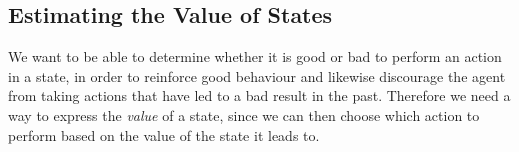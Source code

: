 \documentclass[11pt]{article}
\begin{document}
\maketitle


\subsection{Estimating the Value of States}\label{est_vals}

We want to be able to determine whether it is good or bad to
perform an action in a state, in order to reinforce good behaviour
and likewise discourage the agent from taking actions that have led
to a bad result in the past.
Therefore we need a way to express the \textit{value} of a state,
since we can then choose which action to perform
based on the value of the state it leads to. 
\end{document}

